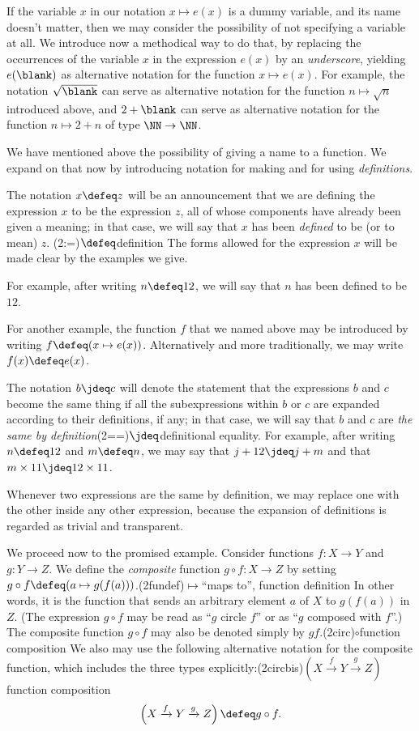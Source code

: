 If the variable $x$ in our notation $x \mapsto e(x)$ is a dummy variable, and its name doesn't matter, then we may consider the possibility of
not specifying a variable at all.  We introduce now a methodical way to do that, by replacing the occurrences of the variable $x$ in the
expression $e(x)$ by an \emph{underscore},
yielding $e(\blank)$ as alternative notation for the function $x \mapsto e(x)$.
For example, the
notation $\sqrt{\vphantom{n}\blank}$ can serve as alternative notation for the function $n \mapsto \sqrt n$ introduced above, and $2 + \blank$ can serve as
alternative notation for the function $n \mapsto 2 + n$ of type $\NN \to \NN$.

We have mentioned above the possibility of giving a name to a function.
We expand on that now by introducing notation for making and for using \emph{definitions}.

The notation $x \defeq z$ will be an announcement that we are defining
the expression $x$ to be the expression $z$, all of whose components have already been given a meaning;
in that case, we will say that $x$ has been \emph{defined} to be (or to mean) $z$.%
\glossary(2:=){$\protect\defeq$}{definition}
The forms allowed for the expression $x$ will be made clear by the examples we give.

For example, after writing $n \defeq 12$, we will say that $n$ has been defined to be $12$.

For another example, the function $f$ that we named above may be introduced by writing $f \defeq ( x \mapsto e(x) )$.
Alternatively and more traditionally, we may write $f(x) \defeq e(x)$.

The notation $b \jdeq c$ will denote the statement that the expressions $b$ and $c$ become the same thing if all the subexpressions within $b$
or $c$ are expanded according to their definitions, if any; in that case, we will say that $b$ and $c$ are \emph{the same by
definition}\glossary(2==){$\jdeq$}{definitional equality}.  For example, after writing $n \defeq 12$ and $m \defeq n$, we may say that $j + 12
\jdeq j + m$ and that $m \times 11 \jdeq 12 \times 11$.

Whenever two expressions are the same by definition, we may replace one with the other inside any other expression, because the expansion of
definitions is regarded as trivial and transparent.

We proceed now to the promised example.  Consider functions $f : X \to Y$ and $g : Y \to Z$.  We define the \emph{composite} function $g \circ f
: X \to Z$ by setting $g \circ f \defeq (a \mapsto g(f(a)))$.\glossary(2fundef){$\mapsto$}{``maps to'', function definition} In other words, it
is the function that sends an arbitrary element $a$ of $X$ to $g(f(a))$ in $Z$.  (The expression $g \circ f$ may be read as ``$g$ circle $f$''
or as ``$g$ composed with $f$''.)  The composite function $g \circ f$ may also be denoted simply by $gf$.\glossary(2circ){$\circ$}{function composition}
We also may use the following alternative notation for the composite function, which includes the three
types explicitly:\glossary(2circbis){$ ( X \xrightarrow f Y \xrightarrow g Z ) $}{function composition}
\[
  \left( X \xrightarrow f Y \xrightarrow g Z \right) \defeq g \circ f.
\]

